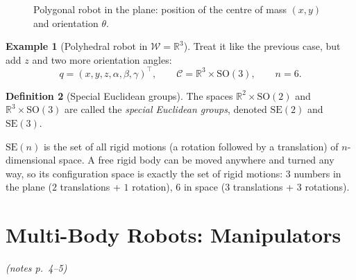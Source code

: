 \documentclass[11pt,a4paper]{article}
\newcommand{\R}{\mathbb{R}}
\newcommand{\W}{\mathcal{W}}
\newcommand{\C}{\mathcal{C}}
\newcommand{\SO}{\mathrm{SO}}
\newcommand{\SE}{\mathrm{SE}}
\newcommand{\pts}[1]{\emph{(notes p.~#1)}}
\theoremstyle{definition}
\newtheorem{definition}{Definition}[section]
\newtheorem{example}[definition]{Example}
\theoremstyle{plain}
\begin{document}
\begin{figure}[ht]
\centering
{}
\caption{Polygonal robot in the plane: position of the centre of mass $(x,y)$ and orientation $\theta$.}
\end{figure}

\begin{example}[Polyhedral robot in $\W=\R^3$]
Treat it like the previous case, but add $z$ and two more orientation angles:
\[
  q=(x,y,z,\alpha,\beta,\gamma)^\top,\qquad \C=\R^3\times\SO(3),\qquad n=6.
\]
\end{example}

\begin{definition}[Special Euclidean groups]
The spaces $\R^2\times\SO(2)$ and $\R^3\times\SO(3)$ are called the \emph{special Euclidean groups}, denoted $\SE(2)$ and $\SE(3)$.
\end{definition}

\begin{intuition}
$\SE(n)$ is the set of all rigid motions (a rotation followed by a translation) of $n$-dimensional space. A free rigid body can be moved anywhere and turned any way, so its configuration space is exactly the set of rigid motions: $3$ numbers in the plane ($2$ translations + $1$ rotation), $6$ in space ($3$ translations + $3$ rotations).
\end{intuition}

\section{Multi-Body Robots: Manipulators}\pts{4--5}
\end{document}
